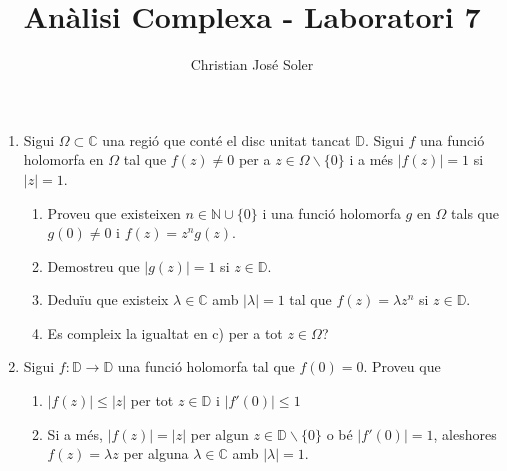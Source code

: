\documentclass[10pt,a4paper]{article}
\author{Christian José Soler}
\title{Anàlisi Complexa - Laboratori 7}
\begin{document}
\maketitle

\begin{enumerate}
\item Sigui $\Omega\subset\mathbb{C}$ una regió que conté el disc unitat tancat $\mathbb{D}$. Sigui $f$ una funció
holomorfa en $\Omega$ tal que $f(z)\neq 0$ per a $z\in\Omega\backslash\{0\}$ i a més $|f(z)| = 1$ si $|z| = 1$.
	\begin{enumerate}
	\item Proveu que existeixen $n\in\mathbb{N}\cup\{0\}$ i una funció holomorfa $g$ en $\Omega$ tals que $g(0)\neq 0$ i $f(z) = z^{n}g(z)$. 
	\begin{framed}
	
	\end{framed}
	\item Demostreu que $|g(z)| = 1$ si $z\in\mathbb{D}$.
	\begin{framed}
	
	\end{framed}
	\item Deduïu que existeix $\lambda\in\mathbb{C}$ amb $|\lambda| = 1$ tal que $f(z) = \lambda z^{n}$ si $z\in\mathbb{D}$.
	\begin{framed}
	
	\end{framed}
	\item Es compleix la igualtat en c) per a tot $z\in\Omega$?
	\begin{framed}
	
	\end{framed}
	\end{enumerate}
\item Sigui $f:\mathbb{D} \rightarrow \mathbb{D}$ una funció holomorfa tal que $f(0) = 0$. Proveu que
	\begin{enumerate}
	\item $|f(z)|\leq|z|$ per tot $z\in\mathbb{D}$ i $|f'(0)|\leq 1$
	\begin{framed}
	
	\end{framed}
	\item Si a més, $|f(z)| = |z|$ per algun $z\in\mathbb{D}\backslash\{0\}$ o bé $|f'(0)| = 1$, aleshores $f(z) = \lambda z$ per alguna $\lambda\in\mathbb{C}$ amb $|\lambda| = 1$.
	\begin{framed}
	
	\end{framed}
	\end{enumerate}			
\end{enumerate}
\end{document}
